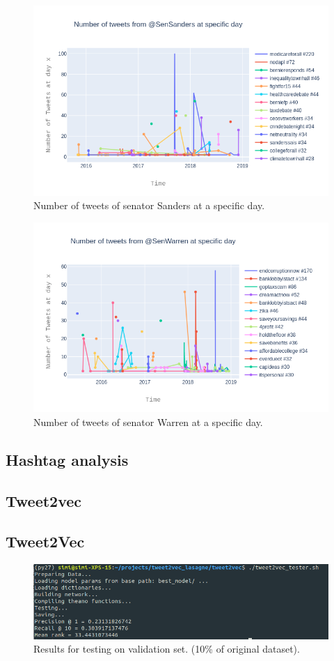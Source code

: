 \documentclass[10pt,conference,compsocconf]{IEEEtran}
\begin{document}
\begin{figure}
	\centering
	\includegraphics[width=0.7\linewidth]{images/tweets_of_sensanders_overtime}
	\caption{Number of tweets of senator Sanders at a specific day.}
	\label{fig:tweetsSanders}
\end{figure}
\begin{figure}
	\centering
	\includegraphics[width=0.7\linewidth]{images/tweets_of_senwarren_overtime}
	\caption{Number of tweets of senator Warren at a specific day.}
	\label{fig:tweetsWarren}
\end{figure}



\subsection{Hashtag analysis}


\subsection{Tweet2vec}


\subsection{Tweet2Vec}
\begin{figure}
	\centering
	\includegraphics[width=0.7\linewidth]{images/tweet2vec_training}
	\caption{Results for testing on validation set. (10\% of original dataset).}
	\label{fig:tweet2vectraining}
\end{figure}
\end{document}
